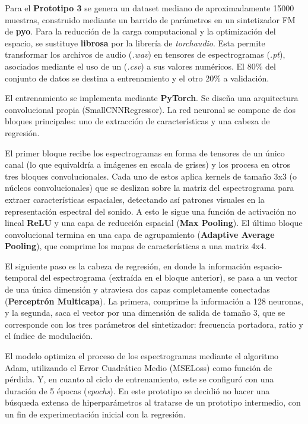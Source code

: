 \documentclass[12pt, a4paper]{article}
\begin{document}
Para el \textbf{Prototipo 3} se genera un dataset mediano de aproximadamente 15000 muestras, construido 
mediante un barrido de parámetros en un sintetizador FM de \textbf{pyo}. Para la reducción de la carga computacional
y la optimización del espacio, se sustituye \textbf{librosa} por la librería de \textit{torchaudio}. Esta permite
transformar los archivos de audio (\textit{.wav}) en tensores de espectrogramas (\textit{.pt}),
asociados mediante el uso de un (\textit{.csv}) a sus valores numéricos. El 80\% del conjunto de datos se destina 
a entrenamiento y el otro 20\% a validación.

El entrenamiento se implementa mediante \textbf{PyTorch}. Se diseña una arquitectura convolucional 
propia (SmallCNNRegressor). La red neuronal se compone de dos bloques principales:
uno de extracción de características y una cabeza de regresión. 

El primer bloque recibe los espectrogramas en forma de tensores de un único canal (lo que equivaldría a 
imágenes en escala de grises) y los procesa en otros tres bloques convolucionales. Cada uno de estos aplica
kernels de tamaño 3x3 (o núcleos convolucionales) que se deslizan sobre la matriz del espectrograma
para extraer características espaciales, detectando así patrones visuales en la representación espectral del sonido.
A esto le sigue una función de activación no lineal \textbf{ReLU} y una capa de reducción espacial (\textbf{Max Pooling}). 
El último bloque convolucional termina en una capa de agrupamiento (\textbf{Adaptive Average Pooling}), que comprime los
mapas de características a una matriz 4x4.

El siguiente paso es la cabeza de regresión, en donde la información espacio-temporal del espectrograma
(extraída en el bloque anterior), se pasa a un vector de una única dimensión y atraviesa dos capas
completamente conectadas (\textbf{Perceptrón Multicapa}). La primera, comprime la información a 128 neuronas,
y la segunda, saca el vector por una dimensión de salida de tamaño 3, que se corresponde con los tres parámetros
del sintetizador: frecuencia portadora, ratio y el índice de modulación.

El modelo optimiza el proceso de los espectrogramas mediante el algoritmo Adam, utilizando el Error Cuadrático
Medio (MSELoss) como función de pérdida. Y, en cuanto al ciclo de entrenamiento, este se configuró con 
una duración de 5 épocas (\textit{epochs}). En este prototipo se decidió no hacer una búsqueda extensa
de hiperparámetros al tratarse de un prototipo intermedio, con un fin de experimentación inicial 
con la regresión.
\end{document}
